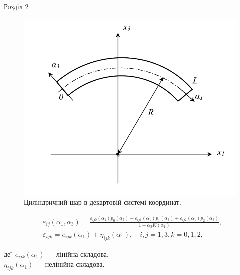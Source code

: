 \documentclass[8pt]{beamer}
\numberwithin{figure}{section}
\numberwithin{equation}{section}
\numberwithin{table}{section}
\begin{document}
\begin{frame}{Розділ 2}
\begin{figure}
\includegraphics[scale=0.25]{pic/cylplate_2D.png}
\caption{Циліндричний шар в декартовій системі координат.}
\end{figure}
\begin{equation}
\begin{aligned}
&\varepsilon_{ij} \left( \alpha_1, \alpha_3 \right) = \frac{\varepsilon_{ij0} \left( \alpha_1\right)p_0 \left( \alpha_3\right)+\varepsilon_{ij1} \left( \alpha_1\right)p_1 \left( \alpha_3\right)+\varepsilon_{ij2} \left( \alpha_1\right)p_2 \left( \alpha_3\right)}{1+\alpha_3 K\left( \alpha_1 \right)},\\
&\varepsilon_{ijk} = e_{ijk}\left( \alpha_1\right)+\eta_{ijk}\left( \alpha_1\right), \quad i,j=1,3, k=0,1,2,
\end{aligned}
\end{equation}

\begin{tabbing}
де \= $e_{ijk}\left( \alpha_1\right)$ --- лінійна складова,\\
\> $\eta_{ijk}\left( \alpha_1\right)$ --- нелінійна складова.
\end{tabbing}



\end{frame}
\end{document}
